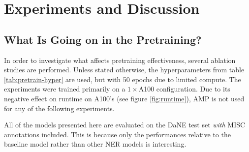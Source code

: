 \documentclass[main.tex]{subfiles}
\begin{document}
\chapter{Experiments and Discussion}
\label{chap:discussion}

\section{What Is Going on in the Pretraining?}
\label{sec:pretrainpls}
In order to investigate what affects pretraining effectiveness, several ablation studies are performed.
Unless stated otherwise, the hyperparameters from table \ref{tab:pretrain-hyper} are used, but with 50 epochs due to limited compute.
The experiments were trained primarily on a $ 1\times$A100 configuration.
Due to its negative effect on runtime on A100's (see figure \ref{fig:runtime}), AMP is not used for any of the following experiments.

All of the models presented here are evaluated on the DaNE test set \emph{with} MISC annotations included.
This is because only the performances relative to the baseline model rather than other NER models is interesting.
\end{document}
